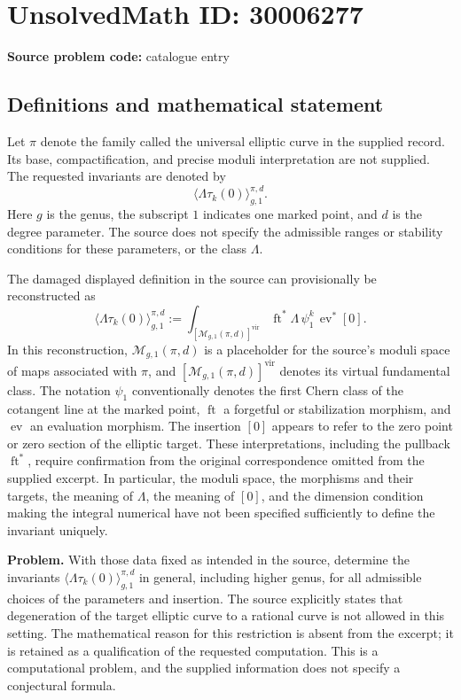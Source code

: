 \documentclass[11pt]{article}
\begin{document}
\section*{UnsolvedMath ID: 30006277}
\textbf{Source problem code:} catalogue entry
\subsection{Definitions and mathematical statement}
Let \(\pi\) denote the family called the universal elliptic curve in the supplied record. Its base, compactification, and precise moduli interpretation are not supplied. The requested invariants are denoted by
\[
\bigl\langle\Lambda\tau_k(0)\bigr\rangle^{\pi,d}_{g,1}.
\]
Here \(g\) is the genus, the subscript \(1\) indicates one marked point, and \(d\) is the degree parameter. The source does not specify the admissible ranges or stability conditions for these parameters, or the class \(\Lambda\).

The damaged displayed definition in the source can provisionally be reconstructed as
\[
\bigl\langle\Lambda\tau_k(0)\bigr\rangle^{\pi,d}_{g,1}
:=
\int_{[\mathcal M_{g,1}(\pi,d)]^{\mathrm{vir}}}
\operatorname{ft}^{*}\Lambda\,\psi_1^{k}\,\operatorname{ev}^{*}[0].
\]
In this reconstruction, \(\mathcal M_{g,1}(\pi,d)\) is a placeholder for the source's moduli space of maps associated with \(\pi\), and \([\mathcal M_{g,1}(\pi,d)]^{\mathrm{vir}}\) denotes its virtual fundamental class. The notation \(\psi_1\) conventionally denotes the first Chern class of the cotangent line at the marked point, \(\operatorname{ft}\) a forgetful or stabilization morphism, and \(\operatorname{ev}\) an evaluation morphism. The insertion \([0]\) appears to refer to the zero point or zero section of the elliptic target. These interpretations, including the pullback \(\operatorname{ft}^{*}\), require confirmation from the original correspondence omitted from the supplied excerpt. In particular, the moduli space, the morphisms and their targets, the meaning of \(\Lambda\), the meaning of \([0]\), and the dimension condition making the integral numerical have not been specified sufficiently to define the invariant uniquely.

\textbf{Problem.} With those data fixed as intended in the source, determine the invariants \(\langle\Lambda\tau_k(0)\rangle^{\pi,d}_{g,1}\) in general, including higher genus, for all admissible choices of the parameters and insertion. The source explicitly states that degeneration of the target elliptic curve to a rational curve is not allowed in this setting. The mathematical reason for this restriction is absent from the excerpt; it is retained as a qualification of the requested computation. This is a computational problem, and the supplied information does not specify a conjectural formula.
\end{document}
